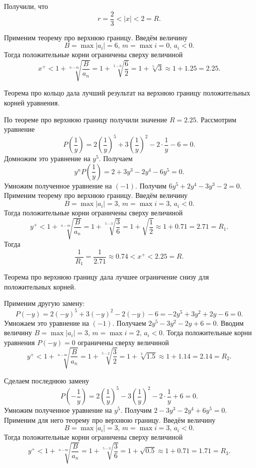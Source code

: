 Получили, что
$$r =
\frac{2}{3} <
\left| x \right| <
2 =
R.$$

Применим теорему про верхнюю границу.
Введём величину
$$B = \max \left| a_i \right| = 6, \,
m = \max i = 0, \,
a_i < 0.$$
Тогда положительные корни ограничены сверху величиной
$$x^{+} <
1 + \sqrt[n - m]{ \frac{B}{a_n}} =
1 + \sqrt[5 - 0]{ \frac{6}{2}} =
1 + \sqrt[5]{3} \approx
1 + 1.25 =
2.25.$$

Теорема про кольцо дала лучший результат на верхнюю границу положительных корней уравнения.

По теореме про верхнюю границу получили значение $R = 2.25$.
Рассмотрим уравнение
$$P \left( \frac{1}{y} \right) =
2 \left( \frac{1}{y} \right)^5 + 3 \left( \frac{1}{y} \right)^2 - 2 \cdot \frac{1}{y} - 6 =
0.$$
Домножим это уравнение на $y^5$.
Получаем
$$y^n P \left( \frac{1}{y} \right) =
2 + 3y^3 - 2y^4 - 6y^5 = 0.$$
Умножим полученное уравнение на $ \left( - 1 \right) $.
Получим $6y^5 + 2y^4 - 3y^3 - 2 = 0$.
Применим теорему про верхнюю границу.
Введём величину
$$B = \max \left| a_i \right| = 3, \,
m = \max i = 3, \,
a_i < 0.$$
Тогда положительные корни ограничены сверху величиной
$$y^{+} <
1 + \sqrt[n - m]{ \frac{B}{a_n}} =
1 + \sqrt[5 - 3]{ \frac{3}{6}} =
1 + \sqrt{ \frac{1}{2}} \approx
1 + 0.71 =
2.71 =
R_1.$$
Тогда
$$ \frac{1}{R_1} =
\frac{1}{2.71} \approx
0.74 <
x^{+} <
2.25 =
R.$$

Теорема про верхнюю границу дала лучшее ограничение снизу для положительных корней.

Применим другую замену:
$$P \left( - y \right) =
2 \left( - y \right)^5 + 3\left( - y \right)^2 - 2 \left( - y \right) - 6 =
- 2y^5 + 3y^2 + 2y - 6 =
0.$$
Умножаем это уравнение на $ \left( - 1 \right) $.
Получаем $2y^5 - 3y^2 - 2y + 6 = 0$.
Вводим величину $B = \max \left| a_i \right| = 3, \, m = \max i = 2, \, a_i < 0$.
Тогда положительные корни уравнения $P \left( - y \right) = 0$ ограничены сверху величиной
$$y^{+} <
1 + \sqrt[n - m]{ \frac{B}{a_n}} =
1 + \sqrt[5 - 2]{ \frac{3}{2}} =
1 + \sqrt[3]{1.5} \approx
1 + 1.14 =
2.14 =
R_2.$$

Сделаем последнюю замену
$$P \left( - \frac{1}{y} \right) =
2 \left( \frac{1}{y} \right)^5 - 3 \left( \frac{1}{y} \right)^2 - 2 \cdot \frac{1}{y} + 6 =
0.$$
Умножим полученное уравнение на $y^5$.
Получим $2 - 3y^3 -2y^4 + 6y^5 = 0$.
Применим для него теорему про верхнюю границу.
Введём величину
$$B = \max \left| a_i \right| = 3, \,
m = \max i = 3, \,
a_i < 0.$$
Тогда положительные корни ограничены сверху величиной
$$y^{+} <
1 + \sqrt[n - m]{ \frac{B}{a_n}} =
1 + \sqrt[5 - 3]{ \frac{3}{6}} =
1 + \sqrt{0.5} \approx
1 + 0.71 =
1.71 =
R_3.$$

